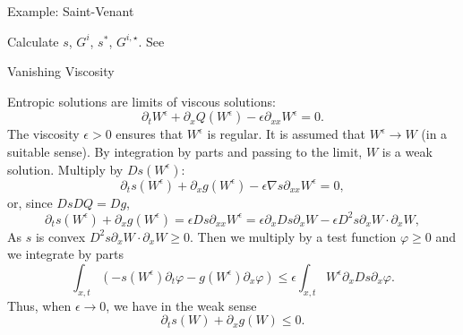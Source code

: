 \documentclass[english]{beamer}
\begin{document}
 \begin{frame}{Example: Saint-Venant}

Calculate $s$, $G^{i}$, $s^{*}$, $G^{i,\star}$. See \cite{guillon2023stability}
\end{frame}
%
\begin{frame}{Vanishing Viscosity}

Entropic solutions are limits of viscous solutions:
\[
\partial_{t}W^{\epsilon}+\partial_{x}Q(W^{\epsilon})-\epsilon\partial_{xx}W^{\epsilon}=0.
\]
The viscosity $\epsilon>0$ ensures that $W^{\epsilon}$ is regular.
It is assumed that $W^{\epsilon}\to W$ (in a suitable sense). By integration by parts and passing to the limit, $W$ is a weak solution. Multiply by $ Ds(W^{\epsilon})$:
\[
\partial_{t}s(W^{\epsilon})+\partial_{x}g(W^{\epsilon})-\epsilon \nabla s\partial_{xx}W^{\epsilon}=0,
\]
or, since $ DsDQ=Dg$,
\[
\partial_{t}s(W^{\epsilon})+\partial_{x}g(W^{\epsilon})=\epsilon Ds\partial_{xx}W^{\epsilon}=\epsilon\partial_{x}Ds\partial_{x}W-\epsilon D^{2}s\partial_{x}W\cdot\partial_{x}W,
\]
As $s$ is convex $D^{2}s\partial_{x}W\cdot\partial_{x}W\geq0$.
Then we multiply by a test function $\varphi\geq0$ and we integrate by parts
\[
\int_{x,t}\left(-s(W^{\epsilon})\partial_{t}\varphi-g(W^{\epsilon})\partial_{x}\varphi\right)\leq\epsilon\int_{x,t}W^{\epsilon}\partial_{x}Ds\partial_{x}\varphi.
\]
Thus, when $\epsilon\to0$, we have in the weak sense
\[
\partial_{t}s(W)+\partial_{x}g(W)\leq0.
\]

\end{frame}
\end{document}
